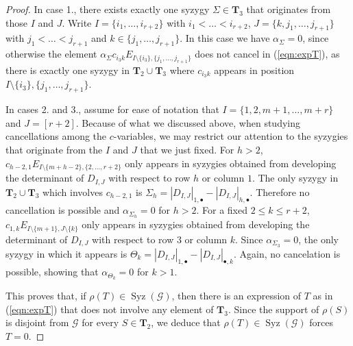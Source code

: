\documentclass[10pt,a4paper]{amsart}
\DeclareMathOperator{\Syz}{Syz}
\begin{document}
\begin{proof}
In case 1., there exists exactly one syzygy $\Sigma\in\mathbf{T}_3$ that originates from those $I$ and $J$. Write $I=\{i_1,\ldots,i_{r+2}\}$ with $i_1<\ldots<i_{r+2}$, $J=\{k,j_1,\ldots,j_{r+1}\}$ with $j_1<\ldots<j_{r+1}$ and $k\in\{j_1,\ldots,j_{r+1}\}$. In this case we have $\alpha_{\Sigma}=0$, since otherwise the element $\alpha_{\Sigma}c_{i_3 k}E_{I\setminus\{i_3\},\{j_1,\ldots,j_{r+1}\}}$ does not cancel in (\ref{eqn:expT}), as there is exactly one syzygy in $\mathbf{T}_2\cup \mathbf{T}_3$ where $c_{i_3 k}$ appears in position $I\setminus\{i_3\},\{j_1,\ldots,j_{r+1}\}$.

In cases 2. and 3., assume for ease of notation that $I=\{1,2,m+1,\ldots,m+r\}$ and $J=[r+2]$.
Because of what we discussed above, when studying cancellations among the $c$-variables, we may restrict our attention to the syzygies that originate from the $I$ and $J$ that we just fixed. For $h>2$, $c_{h-2,1}E_{I\setminus\{m+h-2\},\{2,\ldots,r+2\}}$ only appears in syzygies obtained from developing the determinant of $D_{I,J}$ with respect to row $h$ or column $1$. The only syzygy in $\mathbf{T}_2\cup \mathbf{T}_3$ which involves $c_{h-2,1}$ is $\Sigma_h=|D_{I,J}|_{1,\bullet} - |D_{I,J}|_{h,\bullet}$. Therefore no cancellation is possible and $\alpha_{\Sigma_h}=0$ for $h>2$. For a fixed $2\leq k\leq r+2$, $c_{1,k}E_{I\setminus\{m+1\},J\setminus\{k\}}$ only appears in syzygies obtained from developing the determinant of $D_{I,J}$ with respect to row $3$ or column $k$.
Since $\alpha_{\Sigma_3}=0$, the only syzygy in which it appears is $\Theta_k=|D_{I,J}|_{1,\bullet} - |D_{I,J}|_{\bullet,k}$. Again, no cancelation is possible, showing that $\alpha_{\Theta_k}=0$ for $k>1$.

This proves that, if $\rho(T)\in\Syz(\mathcal{G})$, then there is an expression of $T$ as in (\ref{eqn:expT}) that does not involve any element of $\mathbf{T}_3$. Since the support of $\rho(S)$ is disjoint from $\mathcal{G}$ for every $S\in\mathbf{T}_2$, we deduce that $\rho(T)\in\Syz(\mathcal{G})$ forces $T=0$. 
\end{proof}
\end{document}
